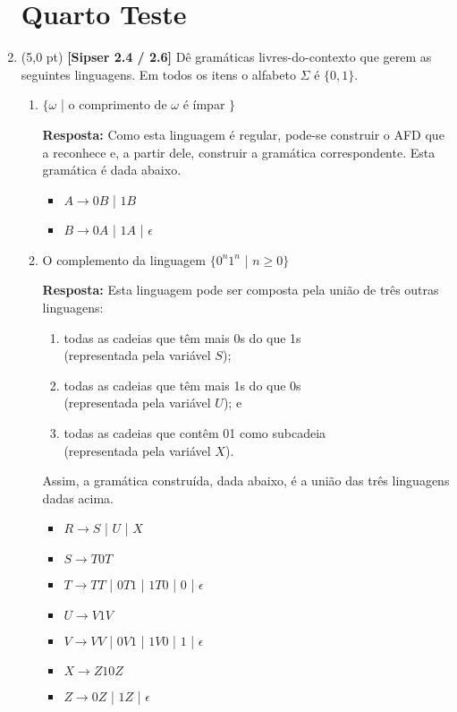 \documentclass[12pt,a4paper,oneside]{article}
\begin{document}
\begin{enumerate}
	
	\section*{Quarto Teste}
	
	\item (5,0 pt) {\bf [Sipser 2.4 / 2.6]}  Dê gramáticas livres-do-contexto que gerem as seguintes linguagens. Em todos os itens o alfabeto $\Sigma$ é $\{0,1\}$.
		\begin{enumerate}
			\item $\{\omega$ | o comprimento de $\omega$ é ímpar $\}$
			
			\vspace*{0.3cm}
			
			{\color{blue} {\bf Resposta:} Como esta linguagem é regular, pode-se construir o AFD que a reconhece e, a partir dele, construir a gramática correspondente. Esta gramática é dada abaixo.
				\begin{itemize}
					\item[] $A \rightarrow 0B$ | $1B$
					\item[] $B \rightarrow 0A$ | $1A$ | $\epsilon$
				\end{itemize}
			}
			\item  O complemento da linguagem $\{0^n 1^n$ | $n \geq 0 \}$
			
			\vspace*{0.3cm}
			
			{\color{blue} {\bf Resposta:} Esta linguagem pode ser composta pela união de três outras linguagens: 
				\begin{enumerate}
					\item todas as cadeias que têm mais 0s do que 1s \\(representada pela variável $S$);
					\item todas as cadeias que têm mais 1s do que 0s \\(representada pela variável $U$); e
					\item todas as cadeias que contêm 01 como subcadeia \\(representada pela variável $X$).
				\end{enumerate}
			Assim, a gramática construída, dada abaixo, é a união das três linguagens dadas acima.
			
				\begin{itemize}
					\item[] $R \rightarrow S$ | $U$ | $X$
					\item[] $S \rightarrow T0T$
					\item[] $T \rightarrow  TT$ | $0T1$ | $1T0$ | $0$ | $\epsilon$
					\item[] $U \rightarrow V1V$
					\item[] $V \rightarrow  VV$ | $0V1$ | $1V0$ | $1$ | $\epsilon$
					\item[] $X \rightarrow Z10Z$
					\item[] $Z \rightarrow 0Z$ | $1Z$ | $\epsilon$
				\end{itemize}
			}
		\end{enumerate}
	

\end{enumerate}
\end{document}
